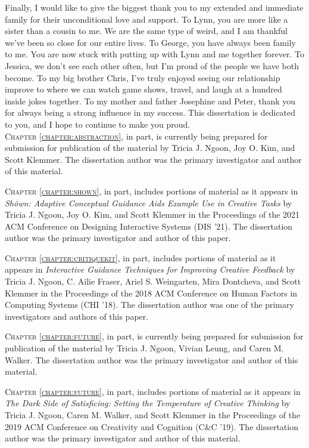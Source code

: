 Finally, I would like to give the biggest thank you to my extended and immediate family for their unconditional love and support. To Lynn, you are more like a sister than a cousin to me. We are the same type of weird, and I am thankful we've been so close for our entire lives. To George, you have always been family to me. You are now stuck with putting up with Lynn and me together forever. To Jessica, we don't see each other often, but I'm proud of the people we have both become. To my big brother Chris, I've truly enjoyed seeing our relationship improve to where we can watch game shows, travel, and laugh at a hundred inside jokes together. To my mother and father Josephine and Peter, thank you for always being a strong influence in my success. This dissertation is dedicated to you, and I hope to continue to make you proud.
\\

\textsc{Chapter \ref{chapter:abstraction}}, in part, is currently being prepared for submission for publication of the material by Tricia J. Ngoon, Joy O. Kim, and Scott Klemmer. The dissertation author was the primary investigator and author of this material.

\textsc{Chapter \ref{chapter:shown}}, in part, includes  portions of material as it appears in \textit{Sh\"{o}wn: Adaptive Conceptual Guidance Aids Example Use in Creative Tasks} by Tricia  J. Ngoon, Joy O. Kim, and Scott Klemmer in the Proceedings of the 2021 ACM Conference on Designing Interactive Systems (DIS '21). The dissertation author was the primary investigator and author of this paper.

\textsc{Chapter \ref{chapter:critiquekit}}, in part, includes portions of material as it appears in \textit{Interactive Guidance Techniques for Improving Creative Feedback} by Tricia J. Ngoon, C. Ailie Fraser, Ariel S. Weingarten, Mira Dontcheva, and Scott Klemmer in the Proceedings of the 2018 ACM Conference on Human Factors in Computing Systems (CHI '18). The dissertation author was one of the primary investigators and authors of this paper.

\textsc{Chapter \ref{chapter:future}}, in part, is currently being prepared for submission for publication of the material by Tricia J. Ngoon, Vivian Leung, and Caren M. Walker. The dissertation author was the primary investigator and author of this material.

\textsc{Chapter \ref{chapter:future}}, in part, includes portions of material as it appears in \textit{The Dark Side of Satisficing: Setting the Temperature of Creative Thinking} by Tricia J. Ngoon, Caren M. Walker, and Scott Klemmer in the Proceedings of the 2019 ACM Conference on Creativity and Cognition (C\&C '19). The dissertation author was the primary investigator and author of this material.

